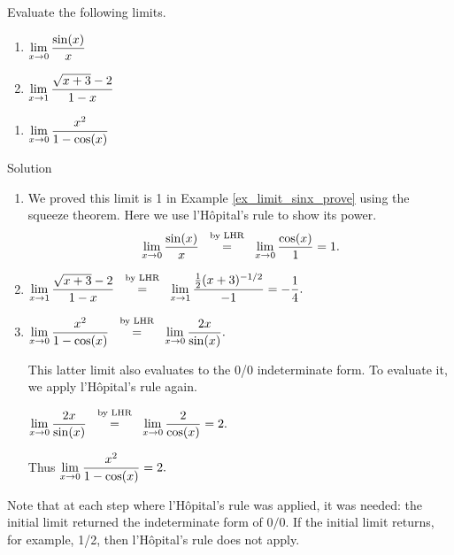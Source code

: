 \begin{example}\label{ex_lhr1}
Evaluate the following limits.

\noindent%
\begin{minipage}[t]{.5\textwidth}
\begin{enumerate}
\item		$\displaystyle \lim_{x\to0}\frac{\sin (x)}x$
\item		$\displaystyle \lim_{x\to 1}\frac{\sqrt{x+3}-2}{1-x}$
\end{enumerate}
\end{minipage}
\begin{minipage}[t]{.5\textwidth}
\begin{enumerate}\addtocounter{enumi}{2}
\item		$\displaystyle \lim_{x\to0}\frac{x^2}{1-\cos (x)}$
\end{enumerate}
\end{minipage}

\ifcalculus\pagebreak\fi
{}Solution 

\begin{enumerate}
\item		We proved this limit is 1 in Example \ref{ex_limit_sinx_prove} using the squeeze theorem. Here we use l'H\^opital's rule to show its power.
$$\lim_{x\to0}\frac{\sin (x)}x \stackrel{\ \text{ by LHR \rule[-5pt]{0pt}{3pt}} \ }{=} \lim_{x\to0} \frac{\cos (x)}{1}=1.$$

\item	\hfill $\ds \lim_{x\to 1}\frac{\sqrt{x+3}-2}{1-x} 	 \stackrel{\ \text{ by LHR \rule[-5pt]{0pt}{3pt}} \ }{=} \lim_{x \to 1} \frac{\frac12(x+3)^{-1/2}}{-1} =-\frac 14.$\hfill\null 

\item		\hfill $\ds \lim_{x\to 0}\frac{x^2}{1-\cos (x)}  \stackrel{\ \text{ by LHR \rule[-5pt]{0pt}{3pt}} \ }{=}  \lim_{x\to 0} \frac{2x}{\sin (x)}.$ \hfill\null

This latter limit also evaluates to the 0/0 indeterminate form. To evaluate it, we apply l'H\^opital's rule again.

\hfill $\ds  \lim_{x\to 0} \frac{2x}{\sin (x)}  \stackrel{\ \text{ by LHR \rule[-5pt]{0pt}{3pt}} \ }{=} \lim_{x\to0}\frac{2}{\cos (x)} = 2 .$ \hfill\null

Thus $\displaystyle \lim_{x\to0}\frac{x^2}{1-\cos (x)}=2.$

\end{enumerate}
\end{example}

Note that at each step where l'H\^opital's rule was applied, it was needed: the initial limit returned the indeterminate form of $0/0$. If the initial limit returns, for example, 1/2, then l'H\^opital's rule does not apply.



